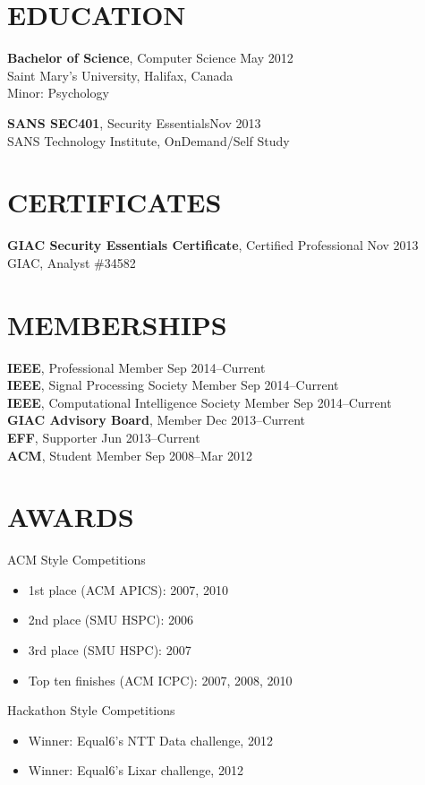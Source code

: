 \documentclass[line,margin]{res}
\begin{document}
\begin{resume}
\section{EDUCATION}
\textbf{Bachelor of Science}, Computer Science \hfill May 2012 \\
Saint Mary's University, Halifax, Canada \\
Minor: Psychology

\textbf{SANS SEC401}, Security Essentials\hfill Nov 2013 \\
SANS Technology Institute, OnDemand/Self Study

\section{CERTIFICATES}
\textbf{GIAC Security Essentials Certificate}, Certified Professional \hfill Nov 2013 \\
GIAC, Analyst \#34582

\section{MEMBERSHIPS}
\textbf{IEEE}, Professional Member \hfill Sep 2014--Current \\
\textbf{IEEE}, Signal Processing Society Member \hfill Sep 2014--Current \\
\textbf{IEEE}, Computational Intelligence Society Member \hfill Sep 2014--Current \\
\textbf{GIAC Advisory Board}, Member \hfill Dec 2013--Current \\
\textbf{EFF}, Supporter \hfill Jun 2013--Current \\
\textbf{ACM}, Student Member \hfill Sep 2008--Mar 2012

\section{AWARDS}
ACM Style Competitions
\begin{itemize} \itemsep-2pt
    \item 1st place (ACM APICS): 2007, 2010
    \item 2nd place (SMU HSPC): 2006
    \item 3rd place (SMU HSPC): 2007
    \item Top ten finishes (ACM ICPC): 2007, 2008, 2010
\end{itemize}

Hackathon Style Competitions
\begin{itemize} \itemsep-2pt
    \item Winner: Equal6's NTT Data challenge, 2012
    \item Winner: Equal6's Lixar challenge, 2012
\end{itemize}


\end{resume}
\end{document}
